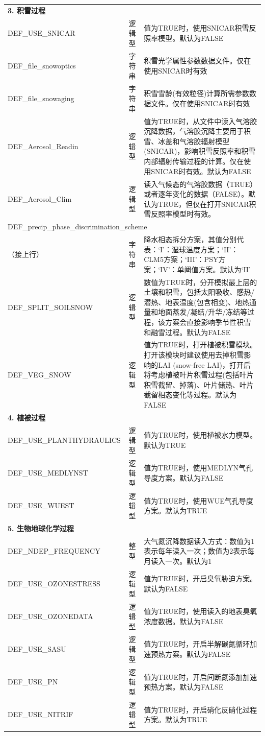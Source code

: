 \documentclass[a4paper,12pt,twoside]{article}
\begin{document}
{\begin{longtable}[!htbp]{lcp{}}
\textbf{3. 积雪过程} && \\
DEF\_USE\_SNICAR & 逻辑型 & 值为TRUE时，使用SNICAR积雪反照率模型。默认为FALSE \\
DEF\_file\_snowoptics & 字符串 & 积雪光学属性参数数据文件。仅在使用SNICAR时有效 \\
DEF\_file\_snowaging  & 字符串 & 积雪雪龄(有效粒径)计算所需参数数据文件。仅在使用SNICAR时有效 \\
DEF\_Aerosol\_Readin & 逻辑型 & 值为TRUE时，从文件中读入气溶胶沉降数据，气溶胶沉降主要用于积雪、冰盖和气溶胶辐射模型 (SNICAR)，影响积雪反照率和积雪内部辐射传输过程的计算。仅在使用SNICAR时有效。默认为FALSE \\
DEF\_Aerosol\_Clim & 逻辑型 & 读入气候态的气溶胶数据（TRUE）或者逐年变化的数据（FALSE）。默认为TRUE，但仅在打开SNICAR积雪反照率模型时有效。\\
\multicolumn{3}{l}{DEF\_precip\_phase\_discrimination\_scheme} \\
（接上行）& 字符串 & 降水相态拆分方案，其值分别代表：`I'：湿球温度方案；`II'：CLM5方案；`III'：PSY方案；`IV'：单阈值方案。默认为`II' \\
DEF\_SPLIT\_SOILSNOW & 逻辑型 & 数值为TRUE时，分开模拟最上层的土壤和积雪，包括太阳吸收、感热/潜热、地表温度(包含相变)、地热通量和地面蒸发/凝结/升华/冻结等过程，该方案会直接影响季节性积雪和融雪过程。默认为FALSE \\
DEF\_VEG\_SNOW & 逻辑型 & 值为TRUE时，打开植被积雪模块。打开该模块时建议使用去掉积雪影响的LAI (snow-free LAI)，打开后将考虑植被叶片积雪过程(包括叶片积雪截留、掉落)、叶片储热、叶片截留相态变化等过程。默认为FALSE \\
\midrule

\textbf{4. 植被过程} && \\
DEF\_USE\_PLANTHYDRAULICS & 逻辑型 & 值为TRUE时，使用植被水力模型。默认为TRUE \\
DEF\_USE\_MEDLYNST & 逻辑型 & 值为TRUE时，使用MEDLYN气孔导度方案。默认为FALSE \\
DEF\_USE\_WUEST & 逻辑型 & 值为TRUE时，使用WUE气孔导度方案。默认为TRUE \\ 
\midrule

\textbf{5. 生物地球化学过程} && \\
DEF\_NDEP\_FREQUENCY & 整型 & 大气氮沉降数据读入方式：数值为1表示每年读入一次；数值为2表示每月读入一次。默认为1 \\
DEF\_USE\_OZONESTRESS & 逻辑型 & 值为TRUE时，开启臭氧胁迫方案。默认为FALSE \\
DEF\_USE\_OZONEDATA & 逻辑型 & 值为TRUE时，使用读入的地表臭氧浓度数据。默认为FALSE \\
DEF\_USE\_SASU & 逻辑型 & 值为TRUE时，开启半解碳氮循环加速预热方案。默认为FALSE\\
DEF\_USE\_PN & 逻辑型 & 值为TRUE时，开启间断氮添加加速预热方案。默认为FALSE\\
DEF\_USE\_NITRIF & 逻辑型 & 值为TRUE时，开启硝化反硝化过程方案。默认为TRUE \\
\midrule


\end{longtable}}
\end{document}

